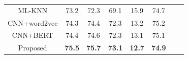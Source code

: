 \documentclass{beamer}
\begin{document}
\begin{frame}
\begin{table}
{\begin{tabular}{cccccccc}
        ML-KNN       & 73.2                          & 72.3                          & 69.1                        & 15.9                      & 74.7                       \\
        CNN+word2vec & 74.3                          & 74.4                          & 72.3                        & 13.2                      & 75.2                       \\
        CNN+BERT     & 74.4                          & 74.6                          & 72.3                        & 13.1                      & 75.1                       \\
        Proposed     & \textbf{75.5}                 & \textbf{75.7}                 & \textbf{73.1}               & \textbf{12.7}             & \textbf{74.9}              \\
        \bottomrule
      \end{tabular}}
  \end{table}
\end{frame}
\end{document}

